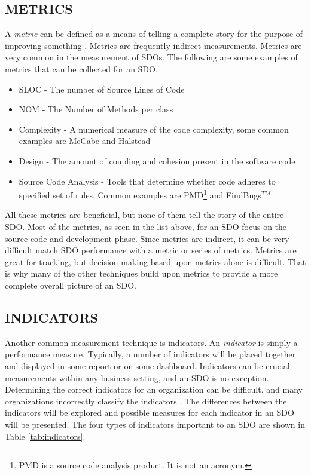 \documentclass[SDSUThesis.tex]{subfiles}
\begin{document}
    \subsection{METRICS}
        A \textit{metric} can be defined as a means of telling a complete story
        for the purpose of improving something \cite{Klubeck2011}.  Metrics are
        frequently indirect measurements. Metrics
        are very common in the measurement of SDOs.  
        The following are some examples of metrics that can be collected 
        for an SDO. 
        \begin{itemize}
            \item SLOC - The number of Source Lines of Code 
            \item NOM - The Number of Methods per class
            \item Complexity - A numerical measure of the code complexity,
                some common examples are McCabe \cite{McCabe1976} and 
                Halstead \cite{Halstead1977}
            \item Design - The amount of coupling and cohesion present 
                in the software code
            \item Source Code Analysis - Tools that determine whether 
                code adheres to specified set of rules. Common 
                examples are PMD\footnote{PMD is a source code analysis product.  
                It is not an acronym.} and FindBugs$^{TM}$ \cite{PMD, Findbugs}.
        \end{itemize}
        All these metrics are beneficial, but none of them tell the story of the entire
        SDO.  Most of the metrics, as seen in the list above, for an SDO focus on 
        the source code and development phase. 
        Since metrics are indirect, it can be very difficult match SDO performance with
        a metric or series of metrics.  Metrics are great for tracking, but decision making
        based upon metrics alone is difficult.  That is why many of the other techniques
        build upon metrics to provide a more complete overall picture of an SDO. 

    \subsection{INDICATORS}
        Another common measurement technique is indicators. An
        \textit{indicator} is simply a performance measure. 
        Typically, a number of indicators will be placed
        together and displayed in some report or on some
        dashboard. 
        Indicators can be crucial measurements
        within any business setting, and an SDO is no exception. Determining
        the correct indicators for an organization can
        be difficult, and many organizations incorrectly classify
        the indicators \cite{parmenter2010}.  
        The differences between the indicators will be explored and
        possible measures for each indicator in an SDO will be
        presented.   The four
        types of indicators important to an SDO are shown
        in Table \ref{tab:indicators}.
        
\end{document}
